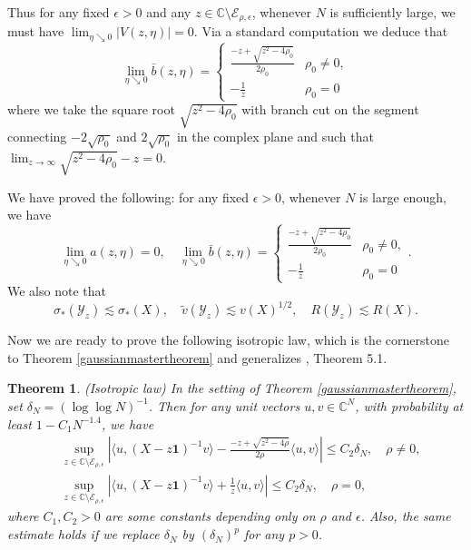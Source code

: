 \documentclass[11pt,reqno]{amsart}
\theoremstyle{plain}
\newtheorem{theorem}{Theorem}[section]
\theoremstyle{remark}
\numberwithin{equation}{section}
\begin{document}
Thus for any fixed $\epsilon>0$ and any $z\in\mathbb{C}\setminus\mathcal{E}_{\rho,\epsilon}$, whenever $N$ is sufficiently large,  we must have $\lim_{\eta\searrow 0}|V(z,\eta)|=0$. Via a standard computation we deduce that $$\lim_{\eta\searrow 0}\bar{b}(z,\eta)=\begin{cases}\frac{-z+\sqrt{z^2-4\rho_0}}{2\rho_0}&\rho_0\neq 0,\\-\frac{1}{z}&\rho_0=0\end{cases}$$ where we take the square root $\sqrt{z^2-4\rho_0}$ with branch cut on the segment connecting $-2\sqrt{\rho_0}$ and $2\sqrt{\rho_0}$ in the complex plane and such that $\lim_{z\to\infty}\sqrt{z^2-4\rho_0}-z=0$. 

We have proved the following: for any fixed $\epsilon>0$, whenever $N$ is large enough, we have
\begin{equation}\label{finalagaggwergqwg}
    \lim_{\eta\searrow 0
    } a(z,\eta)=0,\quad \lim_{\eta\searrow 0}\bar{b}(z,\eta)=\begin{cases}
    \frac{-z+\sqrt{z^2-4\rho_0}}{2\rho_0}&\rho_0\neq 0,\\
    -\frac{1}{z}&\rho_0=0\end{cases}.
\end{equation}
We also note that 
$$
\sigma_*(\mathcal{Y}_z)\lesssim\sigma_*(X),\quad \widetilde{v}(\mathcal{Y}_z)\lesssim v(X)^{1/2},\quad R(\mathcal{Y}_z)\lesssim R(X).
$$

Now we are ready to prove the following isotropic law, which is the cornerstone to Theorem \ref{gaussianmastertheorem} and generalizes \cite{article1221}, Theorem 5.1.

\begin{theorem}\label{theisotropiclaws} (Isotropic law)
    In the setting of Theorem \ref{gaussianmastertheorem}, set $\delta_N=(\log \log N)^{-1}$. Then for any unit vectors $u,v\in\mathbb{C}^N$, with probability at least $1-C_1N^{-1.4}$, we have
\begin{equation}\label{isotropiclaws}
\begin{aligned}&
 \sup_{z\in\mathbb{C}\setminus\mathcal{E}_{\rho,\epsilon}}\left| \langle u,
(X-z\mathbf{1})^{-1}v\rangle -\frac{-z+\sqrt{z^2-4\rho}}{2\rho}\langle u,v\rangle
\right|\leq C_2\delta_N,\quad\rho\neq 0,
\\&    \sup_{z\in\mathbb{C}\setminus\mathcal{E}_{\rho,\epsilon}}\left| \langle u,
(X-z\mathbf{1})^{-1}v\rangle +\frac{1}{z}\langle u,v\rangle
\right|\leq C_2\delta_N,\quad \rho=0,
\end{aligned}\end{equation} where $C_1,C_2>0$ are some constants depending only on $\rho$ and $\epsilon$. Also, the same estimate holds if we replace $\delta_N$ by $(\delta_N)^p$ for any $p>0$.
\end{theorem}
\end{document}

